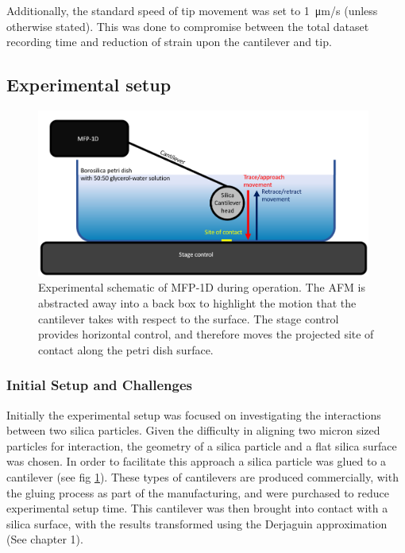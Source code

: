 Additionally, the standard speed of tip movement was set to \SI{1}{\micro\metre/s} (unless otherwise stated). This was done to compromise between the total dataset recording time and reduction of strain upon the cantilever and tip.

\subsection{Experimental setup}

\begin{figure}[h!]     %
        \begin{center}
          \includegraphics[width=110mm]{chapter4/Chapter4ExperiSetup2.PNG}
\end{center}
\caption{Experimental schematic of MFP-1D during operation. The AFM is abstracted away into a back box to highlight the motion that the cantilever takes with respect to the surface. The stage control provides horizontal control, and therefore moves the projected site of contact along the petri dish surface.} 
\label{fig:Chapter4ExperiSetup}                 %
\end{figure}


\subsubsection{Initial Setup and Challenges}

Initially the experimental setup was focused on investigating the interactions between two silica particles. Given the difficulty in aligning two micron sized particles for interaction, the geometry of a silica particle and a flat silica surface was chosen. In order to facilitate this approach a silica particle was glued to a cantilever (see fig \ref{fig:Chapter4ExperiSetup}). These types of cantilevers are produced commercially, with the gluing process as part of the manufacturing, and were purchased to reduce experimental setup time. This cantilever was then brought into contact with a silica surface, with the results transformed using the Derjaguin approximation (See chapter 1). 

